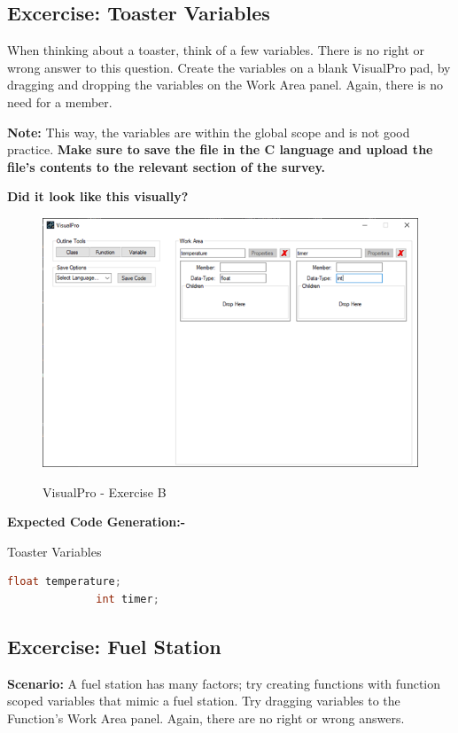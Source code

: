 \documentclass[10pt]{article}
\begin{document}
    \subsection{Excercise: Toaster Variables}
        When thinking about a toaster, think of a few variables. There is no right or wrong answer to this question. Create the variables on a blank VisualPro pad, by dragging and dropping the variables on the Work Area panel. Again, there is no need for a member.

        \textbf{Note:} This way, the variables are within the global scope and is not good practice. \textbf{Make sure to save the file in the C language and upload the file's contents to the relevant section of the survey.}

        \textbf{Did it look like this visually?}
          \begin{figure}[h]
            \centering
            {\includegraphics[scale=0.75]{Figures/Exercises/TutB-SecB-1.png}}
            \caption{VisualPro - Exercise B}
            \label{fig:vp-eB}
          \end{figure}

        \textbf{Expected Code Generation:-}
          \begin{example}{Toaster Variables}
            \begin{lstlisting}[language=c]
              float temperature;
              int timer;
            \end{lstlisting}
          \end{example}
    
    \newpage
    \subsection{Excercise: Fuel Station}
        \textbf{Scenario:} A fuel station has many factors; try creating functions with function scoped variables that mimic a fuel station. Try dragging variables to the Function's Work Area panel. Again, there are no right or wrong answers. 
\end{document}
